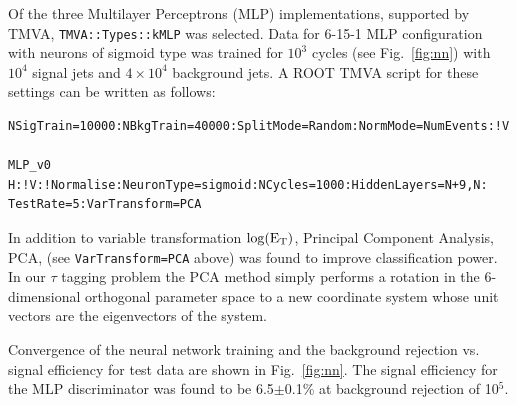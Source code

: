 \documentclass[a4paper]{jpconf}
\begin{document}




Of the three Multilayer Perceptrons (MLP) implementations, 
supported by TMVA,
{\tt TMVA::Types::kMLP} was selected.
Data for 6-15-1 MLP configuration with neurons of sigmoid type 
was trained for $10^3$ cycles (see Fig.~\ref{fig:nn}) with
$10^4$ signal jets and $4\times 10^4$ background jets. 
A ROOT TMVA script for these settings can be written as follows:
 
\begin{verbatim}
NSigTrain=10000:NBkgTrain=40000:SplitMode=Random:NormMode=NumEvents:!V

MLP_v0  H:!V:!Normalise:NeuronType=sigmoid:NCycles=1000:HiddenLayers=N+9,N:
TestRate=5:VarTransform=PCA
\end{verbatim}

In addition to variable transformation $\log({\rm E}_{\rm T})$, 
Principal Component Analysis, PCA, 
(see {\tt  VarTransform=PCA} above) was found to improve classification power.
In our $\tau$ tagging problem the PCA method simply performs a rotation 
in the 6-dimensional orthogonal parameter space to a new coordinate system whose unit vectors
are the eigenvectors of the system. 

Convergence of the neural network training and 
the background rejection vs. signal efficiency for test data are shown in Fig.~\ref{fig:nn}.
The signal efficiency for the MLP discriminator was found to be 6.5$\pm$0.1\% at 
background rejection of 10$^5$.
\end{document}
